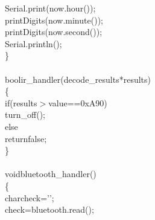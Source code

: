 \documentclass[a4paper, 12pt]{article}
\newcommand\SPC{\hspace*{0.6em}}
\newcommand\HYP{\mbox{\char 45}}
\newcommand{\CppACharacter}[1]{\textcolor[rgb]{0.2,0.4,1}{#1}}
\newcommand{\CppAHexadecimal}[1]{\textcolor[rgb]{1,0,1}{#1}}
\newcommand{\CppAIdentifier}[1]{\textcolor[rgb]{0,1,0}{#1}}
\newcommand{\CppAReservedWord}[1]{\textcolor[rgb]{0,0.5,0}{#1}}
\newcommand{\CppASpace}[1]{\textcolor[rgb]{1,1,1}{\colorbox[rgb]{0,0,0}{#1}}}
\newcommand{\CppASymbol}[1]{\textcolor[rgb]{1,0,0}{#1}}
\begin{document}
\begin{ttfamily}
\CppASpace{\SPC \SPC }\CppAIdentifier{Serial}\CppASymbol{.}\CppAIdentifier{print}\CppASymbol{(}\CppAIdentifier{now}\CppASymbol{.}\CppAIdentifier{hour}\CppASymbol{(}\CppASymbol{)}\CppASymbol{)}\CppASymbol{;}\\
\CppASpace{\SPC \SPC }\CppAIdentifier{printDigits}\CppASymbol{(}\CppAIdentifier{now}\CppASymbol{.}\CppAIdentifier{minute}\CppASymbol{(}\CppASymbol{)}\CppASymbol{)}\CppASymbol{;}\\
\CppASpace{\SPC \SPC }\CppAIdentifier{printDigits}\CppASymbol{(}\CppAIdentifier{now}\CppASymbol{.}\CppAIdentifier{second}\CppASymbol{(}\CppASymbol{)}\CppASymbol{)}\CppASymbol{;}\\
\CppASpace{\SPC \SPC }\CppAIdentifier{Serial}\CppASymbol{.}\CppAIdentifier{println}\CppASymbol{(}\CppASymbol{)}\CppASymbol{;}\CppASpace{\SPC }\\
\CppASymbol{\}}\\
\\
\CppAReservedWord{bool}\CppASpace{\SPC }\CppAIdentifier{ir\_handler}\CppASymbol{(}\CppAIdentifier{decode\_results}\CppASpace{\SPC }\CppASymbol{*}\CppAIdentifier{results}\CppASymbol{)}\\
\CppASymbol{\{}\\
\CppASpace{\SPC \SPC }\CppAReservedWord{if}\CppASpace{\SPC }\CppASymbol{(}\CppAIdentifier{results}\CppASymbol{\HYP $>$}\CppAIdentifier{value}\CppASpace{\SPC }\CppASymbol{==}\CppASpace{\SPC }\CppAHexadecimal{0xA90}\CppASpace{\SPC }\CppASymbol{)}\\
\CppASpace{\SPC \SPC \SPC \SPC }\CppAIdentifier{turn\_off}\CppASymbol{(}\CppASymbol{)}\CppASymbol{;}\\
\CppASpace{\SPC \SPC \SPC \SPC }\CppAReservedWord{else}\CppASpace{\SPC }\\
\CppASpace{\SPC \SPC \SPC \SPC \SPC \SPC }\CppAReservedWord{return}\CppASpace{\SPC }\CppAReservedWord{false}\CppASymbol{;}\\
\CppASymbol{\}}\\
\\
\CppAReservedWord{void}\CppASpace{\SPC }\CppAIdentifier{bluetooth\_handler}\CppASymbol{(}\CppASymbol{)}\\
\CppASymbol{\{}\\
\CppASpace{\SPC \SPC }\CppAReservedWord{char}\CppASpace{\SPC }\CppAIdentifier{check}\CppASpace{\SPC }\CppASymbol{=}\CppASpace{\SPC }\CppACharacter{'\SPC '}\CppASymbol{;}\\
\CppASpace{\SPC \SPC }\CppAIdentifier{check}\CppASpace{\SPC }\CppASymbol{=}\CppASpace{\SPC }\CppAIdentifier{bluetooth}\CppASymbol{.}\CppAIdentifier{read}\CppASymbol{(}\CppASymbol{)}\CppASymbol{;}\\

\end{ttfamily}
\end{document}

